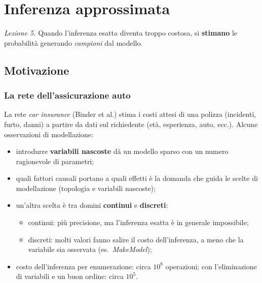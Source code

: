 

\chapter{Inferenza approssimata}

\textit{Lezione 5.} Quando l'inferenza esatta diventa troppo costosa, si
\textbf{stimano} le probabilità generando \emph{campioni} dal modello.

\section{Motivazione}

\subsection{La rete dell'assicurazione auto}

La rete \emph{car insurance} (Binder et al.) stima i costi attesi di una
polizza (incidenti, furto, danni) a partire da dati sul richiedente
(età, esperienza, auto, ecc.). Alcune osservazioni di modellazione:
\begin{itemize}
  \item introdurre \textbf{variabili nascoste} dà un modello sparso con un
        numero ragionevole di parametri;
  \item quali fattori causali portano a quali effetti è la domanda che guida le
        scelte di modellazione (topologia e variabili nascoste);
  \item un'altra scelta è tra domini \textbf{continui} e \textbf{discreti}:
    \begin{itemize}
      \item continui: più precisione, ma l'inferenza esatta è in generale
            impossibile;
      \item discreti: molti valori fanno salire il costo dell'inferenza, a meno
            che la variabile sia osservata (es.\ \textit{MakeModel});
    \end{itemize}
  \item costo dell'inferenza per enumerazione: circa $10^8$ operazioni; con
        l'eliminazione di variabili e un buon ordine: circa $10^5$.
\end{itemize}


